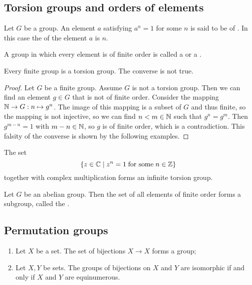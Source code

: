 \subsection{Torsion groups and orders of elements}
\begin{definition}
Let $G$ be a group. An element $a$ satisfying $a^n = 1$ for some $n$ is said to be of . In this case the  of the element $a$ is $n$.

A group in which every element is of finite order is called a  or a .
\end{definition}
\begin{lemma}
Every finite group is a torsion group. The converse is not true.
\end{lemma}
\begin{proof}
Let $G$ be a finite group. Assume $G$ is not a torsion group. Then we can find an element $g\in G$ that is not of finite order. Consider the mapping $\mathbb{N} \to G: n\mapsto g^n$. The image of this mapping is a subset of $G$ and thus finite, so the mapping is not injective, so we can find $n<m\in\mathbb{N}$ such that $g^n = g^m$. Then $g^{m-n}=1$ with $m-n\in \mathbb{N}$, so $g$ is of finite order, which is a contradiction. This falsity of the converse is shown by the following examples.
\end{proof}

\begin{example}
The set
\[ \setbuilder{z\in \C}{z^n = 1\;\text{for some}\; n\in \Z} \]
together with complex multiplication forms an infinite torsion group.
\end{example}

\begin{lemma}
Let $G$ be an abelian group. Then the set of all elements of finite order forms a subgroup, called the .
\end{lemma}


\subsection{Permutation groups}
\begin{proposition} \mbox{}
\begin{enumerate}
\item Let $X$ be a set. The set of bijections $X\to X$ forms a group;
\item Let $X,Y$ be sets. The groups of bijections on $X$ and $Y$ are isomorphic \textup{if and only if} $X$ and $Y$ are equinumerous.
\end{enumerate}
\end{proposition}

